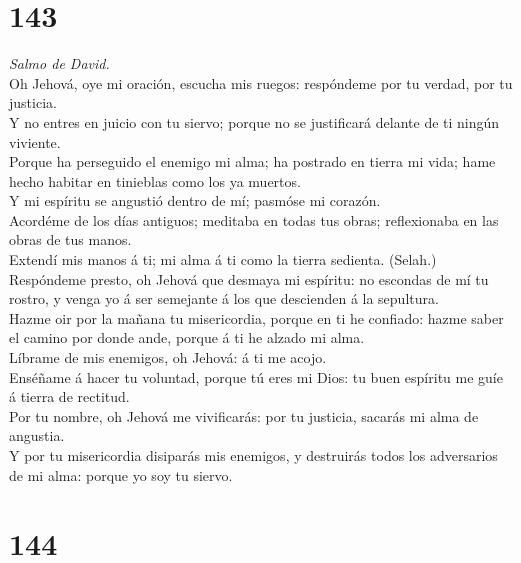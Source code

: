 \hypertarget{section-142}{%
\section{143}\label{section-142}}

 \emph{Salmo de David.}\\
Oh Jehová, oye mi oración, escucha mis ruegos: respóndeme por tu verdad,
por tu justicia.\\
 Y no entres en juicio con tu siervo; porque no se
justificará delante de ti ningún viviente.\\
 Porque ha perseguido el enemigo mi alma; ha postrado en
tierra mi vida; hame hecho habitar en tinieblas como los ya muertos.\\
 Y mi espíritu se angustió dentro de mí; pasmóse mi
corazón.\\
 Acordéme de los días antiguos; meditaba en todas tus obras;
reflexionaba en las obras de tus manos.\\
 Extendí mis manos á ti; mi alma á ti como la tierra
sedienta. (Selah.)\\
 Respóndeme presto, oh Jehová que desmaya mi espíritu: no
escondas de mí tu rostro, y venga yo á ser semejante á los que
descienden á la sepultura.\\
 Hazme oir por la mañana tu misericordia, porque en ti he
confiado: hazme saber el camino por donde ande, porque á ti he alzado mi
alma.\\
 Líbrame de mis enemigos, oh Jehová: á ti me acojo.\\
 Enséñame á hacer tu voluntad, porque tú eres mi Dios: tu
buen espíritu me guíe á tierra de rectitud.\\
 Por tu nombre, oh Jehová me vivificarás: por tu justicia,
sacarás mi alma de angustia.\\
 Y por tu misericordia disiparás mis enemigos, y destruirás
todos los adversarios de mi alma: porque yo soy tu siervo.

\hypertarget{section-143}{%
\section{144}\label{section-143}}

